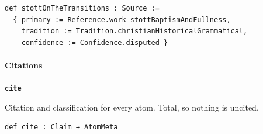 \documentclass[11pt]{article}
\begin{document}
{\small\begin{verbatim}
def stottOnTheTransitions : Source :=
  { primary := Reference.work stottBaptismAndFullness,
    tradition := Tradition.christianHistoricalGrammatical,
    confidence := Confidence.disputed }
\end{verbatim}}
\paragraph*{Citations}
\leavevmode\par\nobreak
\par\medskip\noindent\textbf{\texttt{cite}}\par\nobreak\noindent
Citation and classification for every atom. Total, so nothing is uncited.

{\small\begin{verbatim}
def cite : Claim → AtomMeta
\end{verbatim}}



\end{document}
